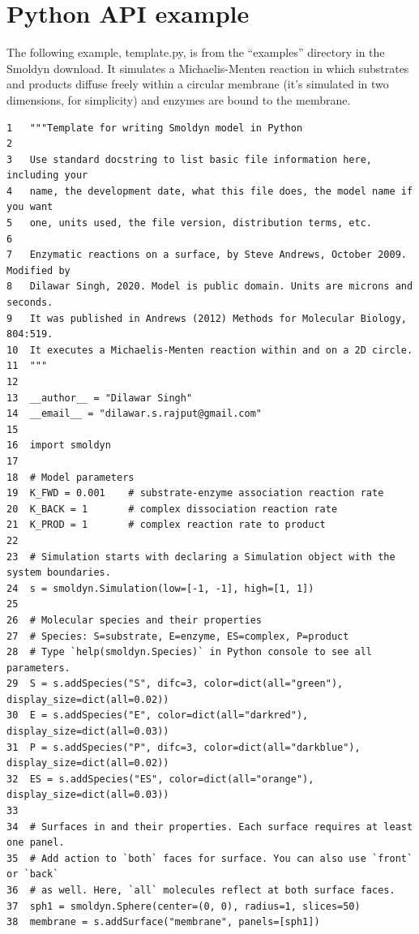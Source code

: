 \documentclass {scrbook}
\begin{document}
\section{Python API example}

The following example, template.py, is from the ``examples'' directory in the Smoldyn download. It simulates a Michaelis-Menten reaction in which substrates and products diffuse freely within a circular membrane (it's simulated in two dimensions, for simplicity) and enzymes are bound to the membrane.

\begin{lstlisting}[style=SSAPython]
1   """Template for writing Smoldyn model in Python
2
3   Use standard docstring to list basic file information here, including your
4   name, the development date, what this file does, the model name if you want
5   one, units used, the file version, distribution terms, etc.
6
7   Enzymatic reactions on a surface, by Steve Andrews, October 2009. Modified by
8   Dilawar Singh, 2020. Model is public domain. Units are microns and seconds.
9   It was published in Andrews (2012) Methods for Molecular Biology, 804:519.
10  It executes a Michaelis-Menten reaction within and on a 2D circle.
11  """
12
13  __author__ = "Dilawar Singh"
14  __email__ = "dilawar.s.rajput@gmail.com"
15
16  import smoldyn
17
18  # Model parameters
19  K_FWD = 0.001    # substrate-enzyme association reaction rate
20  K_BACK = 1       # complex dissociation reaction rate
21  K_PROD = 1       # complex reaction rate to product
22
23  # Simulation starts with declaring a Simulation object with the system boundaries.
24  s = smoldyn.Simulation(low=[-1, -1], high=[1, 1])
25
26  # Molecular species and their properties
27  # Species: S=substrate, E=enzyme, ES=complex, P=product
28  # Type `help(smoldyn.Species)` in Python console to see all parameters.
29  S = s.addSpecies("S", difc=3, color=dict(all="green"), display_size=dict(all=0.02))
30  E = s.addSpecies("E", color=dict(all="darkred"), display_size=dict(all=0.03))
31  P = s.addSpecies("P", difc=3, color=dict(all="darkblue"), display_size=dict(all=0.02))
32  ES = s.addSpecies("ES", color=dict(all="orange"), display_size=dict(all=0.03))
33
34  # Surfaces in and their properties. Each surface requires at least one panel.
35  # Add action to `both` faces for surface. You can also use `front` or `back`
36  # as well. Here, `all` molecules reflect at both surface faces.
37  sph1 = smoldyn.Sphere(center=(0, 0), radius=1, slices=50)
38  membrane = s.addSurface("membrane", panels=[sph1])

\end{lstlisting}
\end{document}
